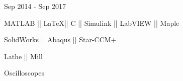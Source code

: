 \begin{subtitle}
\vspace{-8ex}
{{Sep 2014 - Sep 2017}}
\end{subtitle}
\vspace{1ex}

\vspace{-1ex}


\vspace{-1.5ex}
{
\vspace{1.8ex}
\color{cyan}\small
{MATLAB || \LaTeX || C || Simulink || LabVIEW || Maple} %
}

{
\vspace{-2.5ex}\hspace{3.17in}
\color{cyan}\small
{SolidWorks || Abaqus || Star-CCM+} %
}

{
\vspace{-0.5ex}
\color{cyan}\small
{Lathe || Mill} %
}

{
\vspace{-2.5ex}\hspace{3.17in}
\color{cyan}\small
{Oscilloscopes} %
}

